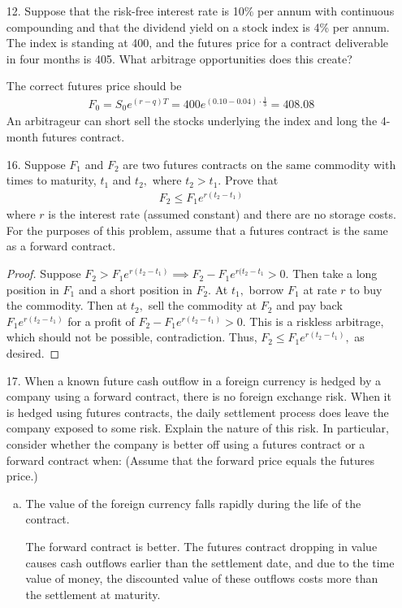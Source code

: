 \documentclass{article}
\begin{document}
\begin{itemize}
	\item[12.] Suppose that the risk-free interest rate is 10\% per annum with continuous compounding and that the dividend yield on a stock index is 4\% per annum. The index is standing at 400, and the futures price for a contract deliverable in four months is 405. What arbitrage opportunities does this create?
		\begin{soln}
			The correct futures price should be
			\begin{align*}
				F_0 = S_0e^{(r-q)T} = 400e^{(0.10-0.04)\cdot \frac{1}{3}} = 408.08
			\end{align*}
			An arbitrageur can short sell the stocks underlying the index and long the 4-month futures contract.
		\end{soln}

	\item[16.] Suppose $F_1$ and $F_2$ are two futures contracts on the same commodity with times to maturity, $t_1$ and $t_2,$ where $t_2>t_1.$ Prove that
		\begin{align*}
			F_2\le F_1e^{r(t_2-t_1)}
		\end{align*}
		where $r$ is the interest rate (assumed constant) and there are no storage costs. For the purposes of this problem, assume that a futures contract is the same as a forward contract.
		\begin{proof}
			Suppose $F_2>F_1e^{r(t_2-t_1)}\implies F_2-F_1e^{r(t_2-t_1}>0.$ Then take a long position in $F_1$ and a short position in $F_2.$ At $t_1,$ borrow $F_1$ at rate $r$ to buy the commodity. Then at $t_2,$ sell the commodity at $F_2$ and pay back $F_1e^{r(t_2-t_1)}$ for a profit of $F_2-F_1e^{r(t_2-t_1)}>0.$ This is a riskless arbitrage, which should not be possible, contradiction. Thus, $F_2\le F_1e^{r(t_2-t_1)},$ as desired.
		\end{proof}

	\item[17.] When a known future cash outflow in a foreign currency is hedged by a company using a forward contract, there is no foreign exchange risk. When it is hedged using futures contracts, the daily settlement process does leave the company exposed to some risk. Explain the nature of this risk. In particular, consider whether the company is better off using a futures contract or a forward contract when: (Assume that the forward price equals the futures price.)
		\begin{enumerate}[(a)]
			\item The value of the foreign currency falls rapidly during the life of the contract.
				\begin{answer*}
					The forward contract is better. The futures contract dropping in value causes cash outflows earlier than the settlement date, and due to the time value of money, the discounted value of these outflows costs more than the settlement at maturity.
				\end{answer*}


\end{enumerate}
\end{itemize}
\end{document}
